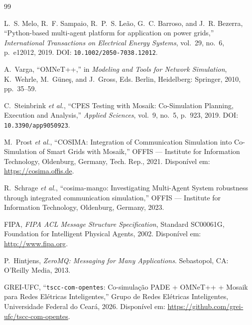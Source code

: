 \documentclass[10pt,twocolumn,a4paper]{article}
\begin{document}
\begin{thebibliography}{99}

L.~S. Melo, R.~F. Sampaio, R.~P.~S. Leão, G.~C. Barroso, and J.~R. Bezerra, ``Python-based multi-agent platform for application on power grids,'' \textit{International Transactions on Electrical Energy Systems}, vol.~29, no.~6, p.~e12012, 2019. DOI: \texttt{10.1002/2050-7038.12012}.

A.~Varga, ``OMNeT++,'' in \textit{Modeling and Tools for Network Simulation}, K.~Wehrle, M.~Güneş, and J.~Gross, Eds. Berlin, Heidelberg: Springer, 2010, pp.~35--59.

C.~Steinbrink \textit{et al.}, ``CPES Testing with Mosaik: Co-Simulation Planning, Execution and Analysis,'' \textit{Applied Sciences}, vol.~9, no.~5, p.~923, 2019. DOI: \texttt{10.3390/app9050923}.

M.~Prost \textit{et al.}, ``COSIMA: Integration of Communication Simulation into Co-Simulation of Smart Grids with Mosaik,'' OFFIS --- Institute for Information Technology, Oldenburg, Germany, Tech. Rep., 2021. Disponível em: \url{https://cosima.offis.de}.

R.~Schrage \textit{et al.}, ``cosima-mango: Investigating Multi-Agent System robustness through integrated communication simulation,'' OFFIS --- Institute for Information Technology, Oldenburg, Germany, 2023.

FIPA, \textit{FIPA ACL Message Structure Specification}, Standard SC00061G, Foundation for Intelligent Physical Agents, 2002. Disponível em: \url{http://www.fipa.org}.

P.~Hintjens, \textit{ZeroMQ: Messaging for Many Applications}. Sebastopol, CA: O'Reilly Media, 2013.

GREI-UFC, ``\texttt{tscc-com-opentes}: Co-simulação PADE + OMNeT++ + Mosaik para Redes Elétricas Inteligentes,'' Grupo de Redes Elétricas Inteligentes, Universidade Federal do Ceará, 2026. Disponível em: \url{https://github.com/grei-ufc/tscc-com-opentes}.

\end{thebibliography}
\end{document}
